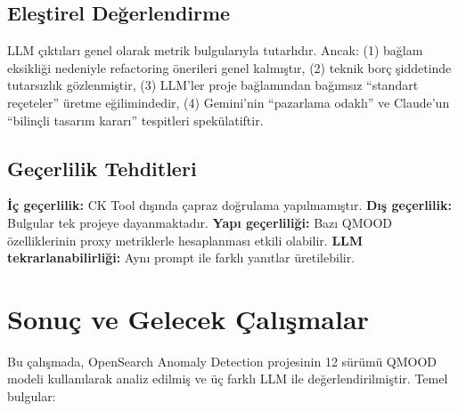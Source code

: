 \documentclass[conference]{IEEEtran}
\begin{document}
\subsection{Ele\c{s}tirel De\u{g}erlendirme}
LLM \c{c}{\i}kt{\i}lar{\i} genel olarak metrik bulgular{\i}yla tutarl{\i}d{\i}r. Ancak: (1) ba\u{g}lam eksikli\u{g}i nedeniyle refactoring \"onerileri genel kalm{\i}\c{s}t{\i}r, (2) teknik bor\c{c} \c{s}iddetinde tutars{\i}zl{\i}k g\"ozlenmi\c{s}tir, (3) LLM'ler proje ba\u{g}lam{\i}ndan ba\u{g}{\i}ms{\i}z ``standart re\c{c}eteler'' \"uretme e\u{g}ilimindedir, (4) Gemini'nin ``pazarlama odakl{\i}'' ve Claude'un ``bilin\c{c}li tasar{\i}m karar{\i}'' tespitleri spek\"ulatiftir.

\subsection{Ge\c{c}erlilik Tehditleri}
\textbf{\.{I}\c{c} ge\c{c}erlilik:} CK Tool d{\i}\c{s}{\i}nda \c{c}apraz do\u{g}rulama yap{\i}lmam{\i}\c{s}t{\i}r. \textbf{D{\i}\c{s} ge\c{c}erlilik:} Bulgular tek projeye dayanmaktad{\i}r. \textbf{Yap{\i} ge\c{c}erlili\u{g}i:} Baz{\i} QMOOD \"ozelliklerinin proxy metriklerle hesaplanmas{\i} etkili olabilir. \textbf{LLM tekrarlanabilirli\u{g}i:} Ayn{\i} prompt ile farkl{\i} yan{\i}tlar \"uretilebilir.

\section{Sonu\c{c} ve Gelecek \c{C}al{\i}\c{s}malar}

Bu \c{c}al{\i}\c{s}mada, OpenSearch Anomaly Detection projesinin 12 s\"ur\"um\"u QMOOD modeli kullan{\i}larak analiz edilmi\c{s} ve \"u\c{c} farkl{\i} LLM ile de\u{g}erlendirilmi\c{s}tir. Temel bulgular:
\end{document}
